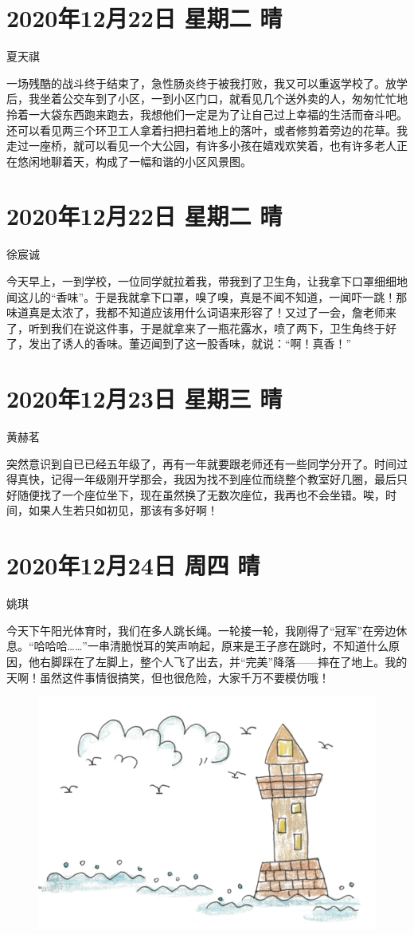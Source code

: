 \section{2020年12月22日 星期二 晴}

夏天祺

一场残酷的战斗终于结束了，急性肠炎终于被我打败，我又可以重返学校了。放学后，我坐着公交车到了小区，一到小区门口，就看见几个送外卖的人，匆匆忙忙地拎着一大袋东西跑来跑去，我想他们一定是为了让自己过上幸福的生活而奋斗吧。还可以看见两三个环卫工人拿着扫把扫着地上的落叶，或者修剪着旁边的花草。我走过一座桥，就可以看见一个大公园，有许多小孩在嬉戏欢笑着，也有许多老人正在悠闲地聊着天，构成了一幅和谐的小区风景图。

\section{2020年12月22日 星期二 晴}

徐宸诚

今天早上，一到学校，一位同学就拉着我，带我到了卫生角，让我拿下口罩细细地闻这儿的“香味”。于是我就拿下口罩，嗅了嗅，真是不闻不知道，一闻吓一跳！那味道真是太浓了，我都不知道应该用什么词语来形容了！又过了一会，詹老师来了，听到我们在说这件事，于是就拿来了一瓶花露水，喷了两下，卫生角终于好了，发出了诱人的香味。董迈闻到了这一股香味，就说：“啊！真香！”

\section{2020年12月23日 星期三 晴}

黄赫茗

突然意识到自已已经五年级了，再有一年就要跟老师还有一些同学分开了。时间过得真快，记得一年级刚开学那会，我因为找不到座位而绕整个教室好几圈，最后只好随便找了一个座位坐下，现在虽然换了无数次座位，我再也不会坐错。唉，时间，如果人生若只如初见，那该有多好啊！

\section{2020年12月24日 周四 晴}

姚琪

今天下午阳光体育时，我们在多人跳长绳。一轮接一轮，我刚得了“冠军”在旁边休息。“哈哈哈……”一串清脆悦耳的笑声响起，原来是王子彦在跳时，不知道什么原因，他右脚踩在了左脚上，整个人飞了出去，并“完美”降落——摔在了地上。我的天啊！虽然这件事情很搞笑，但也很危险，大家千万不要模仿哦！

\begin{figure}[htb]
    \centering
    \includegraphics[width=\textwidth]{figure/07.png}
\end{figure}